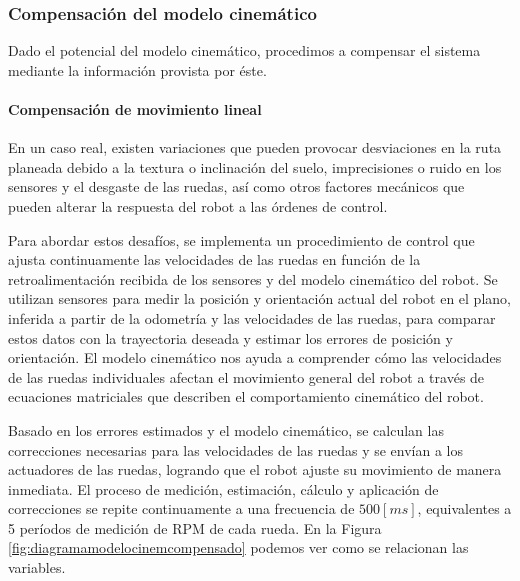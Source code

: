 \subsubsection{Compensación del modelo cinemático}

Dado el potencial del modelo cinemático, procedimos a compensar el sistema mediante la información provista por éste.

\paragraph{Compensación de movimiento lineal} \mbox{} \vspace{8pt}

En un caso real, existen variaciones que pueden provocar desviaciones en la ruta planeada debido a la textura o inclinación del suelo, imprecisiones o ruido en los sensores y el desgaste de las ruedas, así como otros factores mecánicos que pueden alterar la respuesta del robot a las órdenes de control.

Para abordar estos desafíos, se implementa un procedimiento de control que ajusta continuamente las velocidades de las ruedas en función de la retroalimentación recibida de los sensores y del modelo cinemático del robot. Se utilizan sensores para medir la posición y orientación actual del robot en el plano, inferida a partir de la odometría y las velocidades de las ruedas, para comparar estos datos con la trayectoria deseada y estimar los errores de posición y orientación. El modelo cinemático nos ayuda a  comprender cómo las velocidades de las ruedas individuales afectan el movimiento general del robot a través de ecuaciones matriciales que describen el comportamiento cinemático del robot.

Basado en los errores estimados y el modelo cinemático, se calculan las correcciones necesarias para las velocidades de las ruedas y se envían a los actuadores de las ruedas, logrando que el robot ajuste su movimiento de manera inmediata. \cite{rijalusalamkinematics} El proceso de medición, estimación, cálculo y aplicación de correcciones se repite continuamente a una frecuencia de $500[ms]$, equivalentes a 5 períodos de medición de RPM de cada rueda. En la Figura \ref{fig:diagramamodelocinemcompensado} podemos ver como se relacionan las variables.

